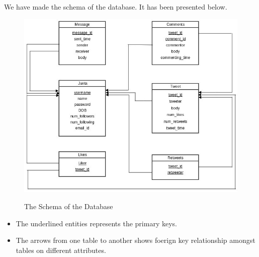 \documentclass[a4paper]{article}
\begin{document}
We have made the schema of the database. It has been presented below.\\
\begin{figure}[h]
\includegraphics[width=15cm]{schema1.jpg}\\
\caption{The Schema of the Database}
\end{figure}
\begin{itemize}
\item The underlined entities represents the primary keys.
\item The arrows from one table to another shows foerign key relationship amongst tables on different attributes.
\end{itemize}
\end{document}
